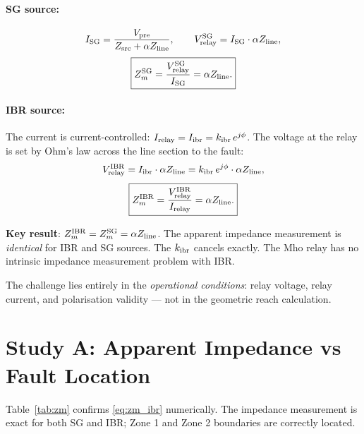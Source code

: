 \documentclass[11pt,a4paper]{article}
\begin{document}
\paragraph{SG source:}
\begin{equation}
  I_{\rm SG} = \frac{V_{\rm pre}}{Z_{\rm src} + \alpha Z_{\rm line}}, \qquad
  V_{\rm relay}^{\rm SG} = I_{\rm SG}\cdot\alpha Z_{\rm line},
\end{equation}
\begin{equation}
  \boxed{Z_m^{\rm SG} = \frac{V_{\rm relay}^{\rm SG}}{I_{\rm SG}} = \alpha Z_{\rm line}.}
  \label{eq:zm_sg}
\end{equation}

\paragraph{IBR source:}
The current is current-controlled: $I_{\rm relay} = I_{\rm ibr} = k_{\rm ibr}\,e^{j\phi}$.
The voltage at the relay is set by Ohm's law across the line section to the fault:
\begin{equation}
  V_{\rm relay}^{\rm IBR} = I_{\rm ibr} \cdot \alpha Z_{\rm line}
                           = k_{\rm ibr}\,e^{j\phi} \cdot \alpha Z_{\rm line},
\end{equation}
\begin{equation}
  \boxed{Z_m^{\rm IBR} = \frac{V_{\rm relay}^{\rm IBR}}{I_{\rm relay}}
        = \alpha Z_{\rm line}.}
  \label{eq:zm_ibr}
\end{equation}

\textbf{Key result}: $Z_m^{\rm IBR} = Z_m^{\rm SG} = \alpha Z_{\rm line}$.
The apparent impedance measurement is \emph{identical} for IBR and SG
sources.  The $k_{\rm ibr}$ cancels exactly.  The Mho relay has no
intrinsic impedance measurement problem with IBR.

The challenge lies entirely in the \emph{operational conditions}:
relay voltage, relay current, and polarisation validity — not in the
geometric reach calculation.

\section{Study A: Apparent Impedance vs Fault Location}

Table~\ref{tab:zm} confirms \eqref{eq:zm_ibr} numerically.
The impedance measurement is exact for both SG and IBR; Zone 1 and
Zone 2 boundaries are correctly located.
\end{document}
